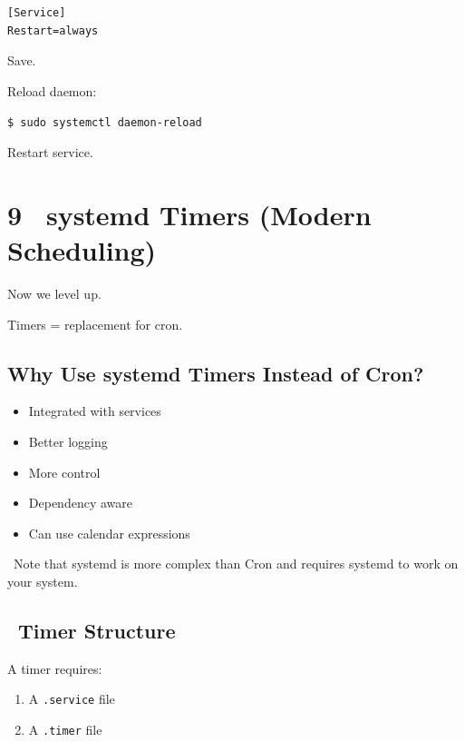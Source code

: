 \documentclass[12pt]{article}
\newcommand{\timericon}{\faClock}
\begin{document}
\begin{highlightbox}
\begin{verbatim}
[Service]
Restart=always
\end{verbatim}
\end{highlightbox}

Save.

Reload daemon:

\begin{highlightbox}
\texttt{\$ sudo systemctl daemon-reload}
\end{highlightbox}

Restart service.

\section*{9 \timericon\ systemd Timers (Modern Scheduling)}

Now we level up.

Timers = replacement for cron.

\subsection*{Why Use systemd Timers Instead of Cron?}

\begin{itemize}
    \item Integrated with services
    \item Better logging
    \item More control
    \item Dependency aware
    \item Can use calendar expressions
\end{itemize}

\begin{infobox}
\faInfoCircle\ Note that systemd is more complex than Cron and requires systemd to work on your system.
\end{infobox}

\subsection*{\faClock\ Timer Structure}

A timer requires:

\begin{enumerate}
    \item A \texttt{.service} file
    \item A \texttt{.timer} file
\end{enumerate}
\end{document}
